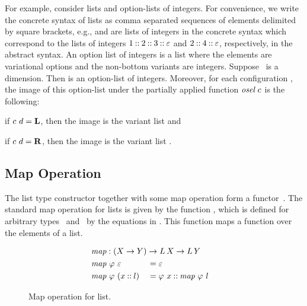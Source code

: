 For example, consider lists and option-lists of integers.
For convenience, we write the concrete syntax of lists as comma separated sequences of elements delimited by square brackets, e.g.,  and  are lists of integers in the concrete syntax which correspond to the lists of integers $1 \mathbin{::} 2 \mathbin{::} 3 \mathbin{::} \color{black}\varepsilon$ and $2 \mathbin{::} 4 \mathbin{::} \color{black}\varepsilon$, respectively, in the abstract syntax.
An option list of integers is a list where the elements are variational options and the non-bottom variants are integers.
Suppose \dE\ is a dimension.
Then  is an option-list of integers.
Moreover, for each configuration \cE, the image of this option-list under the partially applied function $\color{black}\textit{osel}\ \color{black}c$ is the following:
%
\begin{inparaenum}[(1)]
  \item if $\color{black}c\ \color{black}d = \color{black}\mathbf{L}$, then the image is the variant list  and
  \item if $\color{black}c\ \color{black}d = \color{black}\mathbf{R}$, then the image is the variant list .
\end{inparaenum}

\subsection{Map Operation}
\label{sec:map}

The list type constructor \Lst[(\cdot)] together with some map operation form a functor~\citep{Wad92fp,Wad92monad,Wad95monad}.
The standard map operation for lists is given by the function \lmap, which is defined for arbitrary types \Val\ and \ValY\ by the equations in .
This function maps a function over the elements of a list.

\begin{figure}[H]
  \onehalfspacing
  \begin{alignat*}{2}
    &\mathrlap{\lmap : (\Val \to \ValY) \to \Lst \to \Lst[\ValY]} \\
    &\lmap\ \varphi\ \nil &&= \nil \\
    &\lmap\ \varphi\ (\val \cons \lst)
    &&= \varphi\ \val \cons \lmap\ \varphi\ \lst
  \end{alignat*}
  \caption{Map operation for list.}
  \label{fig:map}
\end{figure}

